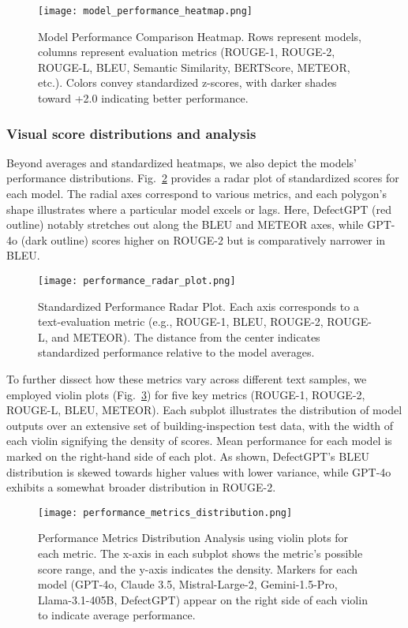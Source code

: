 \documentclass[a4paper,fleqn]{cas-sc}
\begin{document}
\begin{figure}[htbp]
    \centering
    \texttt{[image: model\_performance\_heatmap.png]}
    \caption{Model Performance Comparison Heatmap. Rows represent models, columns represent evaluation metrics (ROUGE-1, ROUGE-2, ROUGE-L, BLEU, Semantic Similarity, BERTScore, METEOR, etc.). Colors convey standardized z-scores, with darker shades toward +2.0 indicating better performance.}
    \label{fig:heatmap}
\end{figure}

\subsubsection{Visual score distributions and analysis}

Beyond averages and standardized heatmaps, we also depict the models' performance distributions. Fig.~\ref{fig:radar-plot} provides a radar plot of standardized scores for each model. The radial axes correspond to various metrics, and each polygon's shape illustrates where a particular model excels or lags. Here, DefectGPT (red outline) notably stretches out along the BLEU and METEOR axes, while GPT-4o (dark outline) scores higher on ROUGE-2 but is comparatively narrower in BLEU.

\begin{figure}[htbp]
    \centering
    \texttt{[image: performance\_radar\_plot.png]}
    \caption{Standardized Performance Radar Plot. Each axis corresponds to a text-evaluation metric (e.g., ROUGE-1, BLEU, ROUGE-2, ROUGE-L, and METEOR). The distance from the center indicates standardized performance relative to the model averages.}
    \label{fig:radar-plot}
\end{figure}

To further dissect how these metrics vary across different text samples, we employed violin plots (Fig.~\ref{fig:violin-distribution}) for five key metrics (ROUGE-1, ROUGE-2, ROUGE-L, BLEU, METEOR). Each subplot illustrates the distribution of model outputs over an extensive set of building-inspection test data, with the width of each violin signifying the density of scores. Mean performance for each model is marked on the right-hand side of each plot. As shown, DefectGPT's BLEU distribution is skewed towards higher values with lower variance, while GPT-4o exhibits a somewhat broader distribution in ROUGE-2.

\begin{figure}[htbp]
    \centering
    \texttt{[image: performance\_metrics\_distribution.png]}
    \caption{Performance Metrics Distribution Analysis using violin plots for each metric. The x-axis in each subplot shows the metric's possible score range, and the y-axis indicates the density. Markers for each model (GPT-4o, Claude 3.5, Mistral-Large-2, Gemini-1.5-Pro, Llama-3.1-405B, DefectGPT) appear on the right side of each violin to indicate average performance.}
    \label{fig:violin-distribution}
\end{figure}
\end{document}
